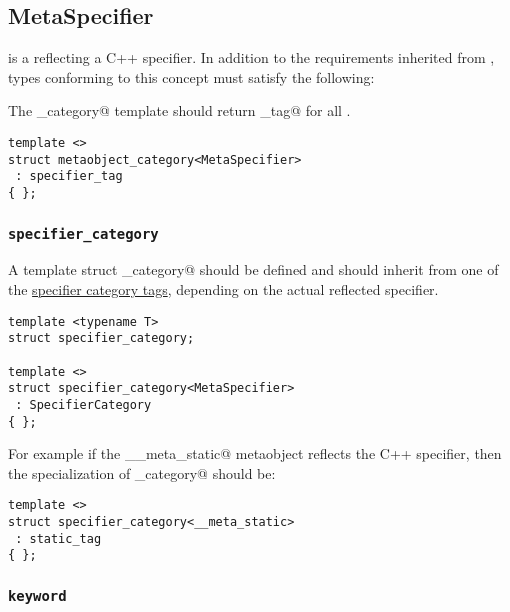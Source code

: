 \subsection{MetaSpecifier}
\label{concept-MetaSpecifier}


 is a  reflecting a C++ specifier. In addition to the requirements
inherited from , types conforming to this concept must satisfy the following:

The \verb@metaobject_category@ template should return \verb@specifier_tag@ for all .

\begin{lstlisting}
template <>
struct metaobject_category<MetaSpecifier>
 : specifier_tag
{ };
\end{lstlisting}

\subsubsection{\texttt{specifier\_category}}

A template struct \verb@specifier_category@ should be defined and should inherit from one of the
\hyperref[specifier-category-tags]{specifier category tags}, depending on
the actual reflected specifier.

\begin{lstlisting}
template <typename T>
struct specifier_category;

template <>
struct specifier_category<MetaSpecifier>
 : SpecifierCategory
{ };
\end{lstlisting}

For example if the \verb@__meta_static@ metaobject reflects the \verb@static@
C++ specifier, then the specialization of \verb@specifier_category@
should be:

\begin{lstlisting}
template <>
struct specifier_category<__meta_static>
 : static_tag
{ };
\end{lstlisting}


\subsubsection{\texttt{keyword}}

